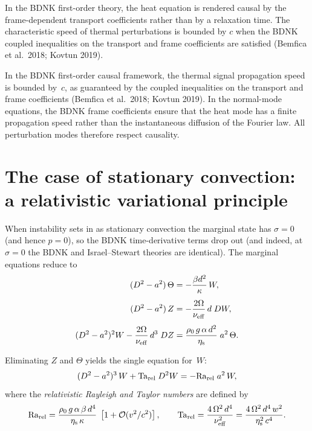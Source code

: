 In the BDNK first-order theory, the heat equation is rendered causal
by the frame-dependent transport coefficients rather than by a
relaxation time.  The characteristic speed of thermal perturbations
is bounded by $c$ when the BDNK coupled inequalities on the
transport and frame coefficients are satisfied
(Bemfica et al.\ 2018; Kovtun 2019).

\begin{causalitycheck}
In the BDNK first-order causal framework, the thermal signal
propagation speed is bounded by~$c$, as guaranteed by the coupled
inequalities on the transport and frame coefficients
(Bemfica et al.\ 2018; Kovtun 2019).
In the normal-mode equations, the BDNK frame coefficients ensure
that the heat mode has a finite propagation speed rather than
the instantaneous diffusion of the Fourier law.
All perturbation modes therefore respect causality.
\end{causalitycheck}


\section{The case of stationary convection: a relativistic variational principle}
\label{sec:rel-3-26}

When instability sets in as stationary convection the marginal state has
$\sigma = 0$ (and hence $p = 0$), so the BDNK time-derivative
terms drop out (and indeed, at $\sigma=0$ the BDNK and
Israel--Stewart theories are identical).  The marginal equations reduce to
\begin{align}
  (D^2 - a^2)\,\Theta
  &= -\frac{\beta d^2}{\kappa}\,W,
  \label{eq:rel-3-96}\\[4pt]
  (D^2 - a^2)\,Z
  &= -\frac{2\Omega}{\nu_{\mathrm{eff}}}\,d\;DW,
  \label{eq:rel-3-97}\\[4pt]
  (D^2 - a^2)^2 W
  - \frac{2\Omega}{\nu_{\mathrm{eff}}}\,d^3\;DZ
  &= \frac{\rho_0\,g\,\alpha\,d^2}{\eta_{\mathrm{s}}}\;a^2\,\Theta.
  \label{eq:rel-3-98}
\end{align}

Eliminating $Z$ and $\Theta$ yields the single equation for~$W$:
\begin{equation}\label{eq:rel-3-99}
  (D^2 - a^2)^3\,W + \mathrm{Ta}_{\mathrm{rel}}\;D^2 W = -\mathrm{Ra}_{\mathrm{rel}}\;a^2\,W,
\end{equation}
where the \emph{relativistic Rayleigh and Taylor numbers} are defined by
\begin{equation}\label{eq:rel-Ra-Ta-def}
  \mathrm{Ra}_{\mathrm{rel}}
  = \frac{\rho_0\,g\,\alpha\,\beta\,d^4}{\eta_{\mathrm{s}}\,\kappa}
    \;\left[1 + \mathcal{O}(v^2/c^2)\right],
  \qquad
  \mathrm{Ta}_{\mathrm{rel}}
  = \frac{4\,\Omega^2\,d^4}{\nu_{\mathrm{eff}}^2}
  = \frac{4\,\Omega^2\,d^4\,w^2}{\eta_{\mathrm{s}}^2\,c^4}.
\end{equation}

